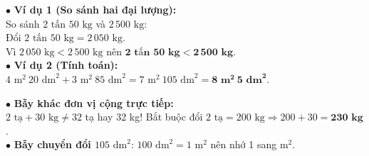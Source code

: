 \documentclass[14pt,a4paper,oneside]{extbook}
\begin{document}
\noindent
\begin{minipage}[t]{0.53\textwidth}
  \begin{tcolorbox}[
    enhanced,
    title={\footnotesize\bfseries\color{white}\faCheckCircle\ Ví dụ thực hành chuẩn mực},
    colback=green!2!white,
    colframe=green!60!black,
    arc=2.5mm, boxrule=0.8pt, top=1.8mm, bottom=1.8mm, left=2.2mm, right=2.2mm
  ]
    \footnotesize
    $\bullet$ \textbf{Ví dụ 1 (So sánh hai đại lượng):}\\
    So sánh $2\text{ tấn } 50\text{ kg}$ và $2\,500\text{ kg}$:\\
    Đổi $2\text{ tấn } 50\text{ kg} = 2\,050\text{ kg}$.\\
    Vì $2\,050\text{ kg} < 2\,500\text{ kg}$ nên $\mathbf{2\text{ tấn } 50\text{ kg} < 2\,500\text{ kg}}$.\\
    $\bullet$ \textbf{Ví dụ 2 (Tính toán):}\\
    $4\text{ m}^2\ 20\text{ dm}^2 + 3\text{ m}^2\ 85\text{ dm}^2 = 7\text{ m}^2\ 105\text{ dm}^2 = \mathbf{8\text{ m}^2\ 5\text{ dm}^2}$.
  \end{tcolorbox}
\end{minipage}%
\hfill
\begin{minipage}[t]{0.45\textwidth}
  \begin{tcolorbox}[
    enhanced,
    title={\footnotesize\bfseries\color{white}\faExclamationTriangle\ Mẹo tránh bẫy trắc nghiệm},
    colback=red!2!white,
    colframe=red!70!black,
    arc=2.5mm, boxrule=0.8pt, top=1.8mm, bottom=1.8mm, left=2.2mm, right=2.2mm
  ]
    \footnotesize
    $\bullet$ \textbf{Bẫy khác đơn vị cộng trực tiếp:}\\
    $2\text{ tạ} + 30\text{ kg} \ne 32$ tạ hay 32 kg! Bắt buộc đổi $2\text{ tạ} = 200\text{ kg} \Rightarrow 200 + 30 = \mathbf{230\text{ kg}}$.\\
    $\bullet$ \textbf{Bẫy chuyển đổi $105\text{ dm}^2$}: $100\text{ dm}^2 = 1\text{ m}^2$ nên nhớ 1 sang $\text{m}^2$.
  \end{tcolorbox}
\end{minipage}
\end{document}
